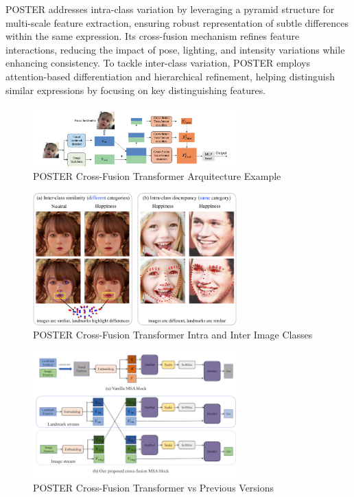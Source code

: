 POSTER addresses intra-class variation by leveraging a pyramid structure for multi-scale feature extraction, ensuring robust representation of subtle differences within the same expression. Its cross-fusion mechanism refines feature interactions, reducing the impact of pose, lighting, and intensity variations while enhancing consistency. To tackle inter-class variation, POSTER employs attention-based differentiation and hierarchical refinement, helping distinguish similar expressions by focusing on key distinguishing features. 

\begin{figure}[H]
\centering
   \includegraphics[width=0.70\textwidth]{../images/poster_image.png}
\caption{POSTER Cross-Fusion Transformer Arquitecture Example}
\label{fig:poster_architecure_example}
\end{figure}


\begin{figure}[H]
\centering
   \includegraphics[width=0.70\textwidth]{../images/intra_inter_classes_images.png}
\caption{POSTER Cross-Fusion Transformer Intra and Inter Image Classes}
\label{fig:intra_inter_classes_images}
\end{figure}
	
\begin{figure}[H]
\centering
   \includegraphics[width=0.70\textwidth]{../images/poster_cross_function.png}
\caption{POSTER Cross-Fusion Transformer vs Previous Versions}
\label{fig:poster_cross_function}
\end{figure}
	

